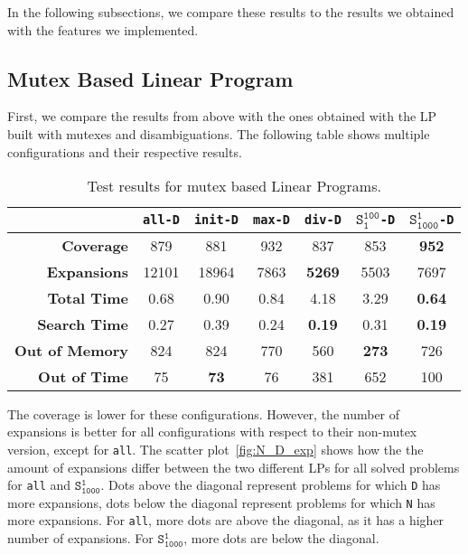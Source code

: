 In the following subsections, we compare these results to the results we obtained with the features we implemented.

\subsection{Mutex Based Linear Program}\label{subsec:mutex-based-linear-program}
First, we compare the results from above with the ones obtained with the LP built with mutexes and disambiguations.
The following table shows multiple configurations and their respective results.

\begin{table}[h!]
    \begin{center}
        \begin{tabular}{|r|c|c|c|c|c|c|}
            \hline
            & \textbf{\texttt{all-D}} & \textbf{\texttt{init-D}} & \textbf{\texttt{max-D}} & \textbf{\texttt{div-D}} & \textbf{$\texttt{S}_\texttt{1}^\texttt{100}$\texttt{-D}}& \textbf{$\texttt{S}_\texttt{1000}^\texttt{1}$\texttt{-D}}\\
            \hline \hline
            \textbf{Coverage}       & 879   & 881           & 932   & 837           & 853           & \textbf{952}  \\ \hline
            \textbf{Expansions}     & 12101 & 18964         & 7863  & \textbf{5269} & 5503          & 7697          \\ \hline
            \textbf{Total Time}     & 0.68  & 0.90          & 0.84  & 4.18          & 3.29          & \textbf{0.64} \\ \hline
            \textbf{Search Time}    & 0.27  & 0.39          & 0.24  & \textbf{0.19} & 0.31          & \textbf{0.19} \\ \hline
            \textbf{Out of Memory}  & 824   & 824           & 770   & 560           & \textbf{273}  & 726           \\ \hline
            \textbf{Out of Time}    & 75    & \textbf{73}   & 76    & 381           & 652           & 100           \\ \hline
        \end{tabular}
        \caption{Test results for mutex based Linear Programs.}
        \label{table:mutex_lp}
    \end{center}
\end{table}

The coverage is lower for these configurations.
However, the number of expansions is better for all configurations with respect to their non-mutex version, except for \texttt{all}.
The scatter plot~\ref{fig:N_D_exp} shows how the the amount of expansions differ between the two different LPs for all solved problems for \texttt{all} and $\texttt{S}_\texttt{1000}^\texttt{1}$.
Dots above the diagonal represent problems for which \texttt{D} has more expansions, dots below the diagonal represent problems for which \texttt{N} has more expansions.
For \texttt{all}, more dots are above the diagonal, as it has a higher number of expansions.
For $\texttt{S}_\texttt{1000}^\texttt{1}$, more dots are below the diagonal.

